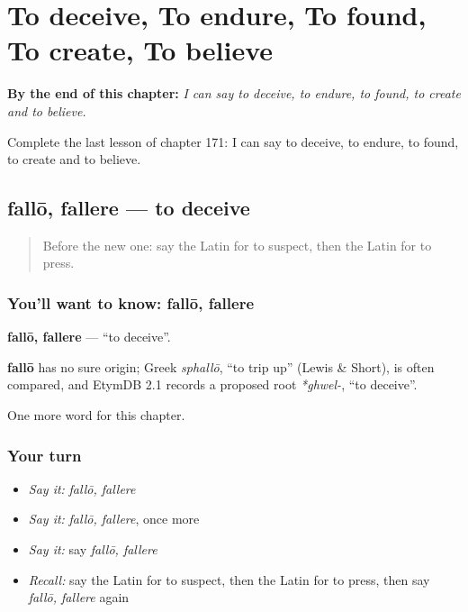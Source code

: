 
\chapter{To deceive, To endure, To found, To create, To believe}
\label{ch:la-to-deceive-to-endure-to-found-to-create-to-believe}

\begin{chapteropening}
\textbf{By the end of this chapter:} \emph{I can say to deceive, to endure, to found, to create and to believe.}

Complete the last lesson of chapter 171: I can say to deceive, to endure, to found, to create and to believe.
\end{chapteropening}

\section[fallō, fallere]{fallō, fallere — to deceive}

\label{lesson:LA-C171-fallo}



\begin{quote}
Before the new one: say the Latin for to suspect, then the Latin for to press.
\end{quote}

\subsection*{You'll want to know: fallō, fallere}
\textbf{fallō, fallere} — \textquotedblleft{}to deceive\textquotedblright{}.

\begin{cousinweb}
\textbf{fallō} has no sure origin; Greek \emph{sphallō}, \textquotedblleft{}to trip up\textquotedblright{} (Lewis \& Short), is often compared, and EtymDB 2.1 records a proposed root \emph{*ghwel-}, \textquotedblleft{}to deceive\textquotedblright{}.
\end{cousinweb}

\begin{grammarlens}[title={What you've built}]
One more word for this chapter.
\end{grammarlens}

\subsection*{Your turn}
\begin{itemize}
\raggedright
  \item \emph{Say it:} \emph{fallō, fallere}
  \item \emph{Say it:} \emph{fallō, fallere}, once more
  \item \emph{Say it:} say \emph{fallō, fallere}
  \item \emph{Recall:} say the Latin for to suspect, then the Latin for to press, then say \emph{fallō, fallere} again
\end{itemize}

